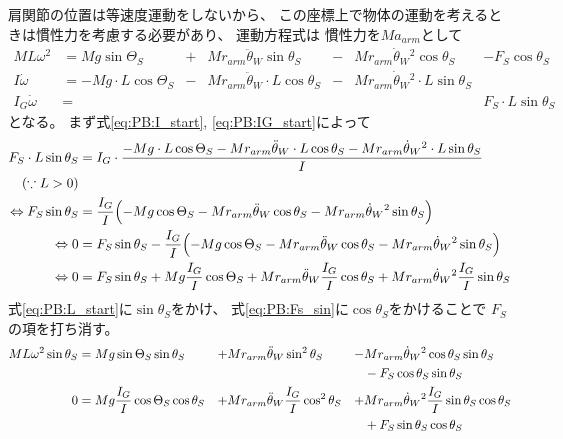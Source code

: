 \documentclass[a4paper,11pt]{jsarticle}
\begin{document}
肩関節の位置は等速度運動をしないから、
この座標上で物体の運動を考えるときは慣性力を考慮する必要があり、
運動方程式は
慣性力を$Ma_{arm}$として
\begin{align}
  ML\omega^2 
  &= Mg\sin\Theta_S 
  &+& Mr_{arm}\ddot{\theta}_W\sin\theta_S 
  &-& Mr_{arm}\dot{\theta}_W{}^2\cos\theta_S 
  &- F_S\cos\theta_S
  \label{eq:PB:L_start}
  \\
  I\dot\omega 
  &= -Mg \cdot L\cos\Theta_S
  &-& Mr_{arm}\ddot{\theta}_W \cdot L \cos\theta_S
  &-& Mr_{arm}\dot{\theta}_W{}^2 \cdot L \sin\theta_S
  &
  \label{eq:PB:I_start}
  \\
  I_G\dot\omega &= & & & & & F_S \cdot L \sin\theta_S
  \label{eq:PB:IG_start}
\end{align}
となる。
まず式\ref{eq:PB:I_start}, \ref{eq:PB:IG_start}によって
\begin{align}
  F_S \cdot L \sin\theta_S
  & = I_G \cdot 
  \frac{
    -Mg \cdot L\cos\Theta_S
    - Mr_{arm}\ddot{\theta}_W \cdot L \cos\theta_S
    - Mr_{arm}\dot{\theta}_W{}^2 \cdot L \sin\theta_S
  }{I}
  \notag
  \\
  \left( \because L > 0 \right) &
  \notag
  \\
  \Leftrightarrow
  F_S\sin\theta_S
  & = \frac{I_G}{I}
  \Bigl(
    -Mg \cos\Theta_S
    - Mr_{arm}\ddot{\theta}_W \cos\theta_S
    - Mr_{arm}\dot{\theta}_W{}^2 \sin\theta_S
  \Bigr)
  \notag
  \\
  \Leftrightarrow
  0
  & = F_S\sin\theta_S - \frac{I_G}{I}
  \Bigl(
    -Mg \cos\Theta_S
    - Mr_{arm}\ddot{\theta}_W \cos\theta_S
    - Mr_{arm}\dot{\theta}_W{}^2 \sin\theta_S
  \Bigr)
  \notag
  \\
  \Leftrightarrow
  0
  & = F_S\sin\theta_S
  +Mg \frac{I_G}{I}\cos\Theta_S
  +Mr_{arm}\ddot{\theta}_W \frac{I_G}{I}\cos\theta_S
  +Mr_{arm}\dot{\theta}_W{}^2 \frac{I_G}{I}\sin\theta_S
  \label{eq:PB:Fs_sin}
\end{align}
式\ref{eq:PB:L_start}に$\sin\theta_S$をかけ、
式\ref{eq:PB:Fs_sin}に$\cos\theta_S$をかけることで
$F_S$の項を打ち消す。
\begin{align*}
  ML\omega^2 \sin\theta_S 
  &= Mg\sin\Theta_S \sin\theta_S
  &+& Mr_{arm}\ddot{\theta}_W\sin^2\theta_S
  &-& Mr_{arm}\dot{\theta}_W{}^2\cos\theta_S \sin\theta_S
  \notag
  \\
  &&&&&- F_S\cos\theta_S\sin\theta_S
  \\
  0
  &=  Mg\frac{I_G}{I}\cos\Theta_S\cos\theta_S
  &+& Mr_{arm}\ddot{\theta}_W \frac{I_G}{I}\cos^2\theta_S
  &+& Mr_{arm}\dot{\theta}_W{}^2 \frac{I_G}{I}\sin\theta_S\cos\theta_S
  \notag
  \\
  &&&&&+ F_S\sin\theta_S\cos\theta_S
\end{align*}
\end{document}
